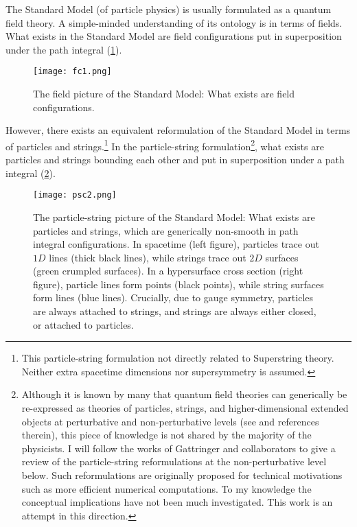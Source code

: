 \documentclass[12pt]{article}
\theoremstyle{definition}
\begin{document}
The Standard Model (of particle physics) is usually formulated as a quantum field theory. A simple-minded understanding of its ontology is in terms of fields. What exists in the Standard Model are field configurations put in superposition under the path integral (\cref{fig:fc1}).

\begin{figure}%
    \centering
    \texttt{[image: fc1.png]}
    \caption{The field picture of the Standard Model: What exists are field configurations.}
    \label{fig:fc1}
\end{figure} 

However, there exists an equivalent reformulation of the Standard Model in terms of particles and strings.\footnote{This  particle-string formulation not directly related to Superstring theory. Neither extra spacetime dimensions nor supersymmetry is assumed.} In the particle-string formulation\footnote{Although it is known by many that quantum field theories can generically be re-expressed as theories of particles, strings, and higher-dimensional extended objects at perturbative and non-perturbative levels (see \cite{Feynman1950MathematicalInteraction, *Feynman1951AnElectrodynamics, Wilson1974ConfinementQuarks, Kleinert1989GaugeMatter, Fernandez1992RandomTheory, Bruegmann19924dMeasure, Ambjrn1997QuantumGeometry, Costello2011RenormalizationTheory, Gattringer2016ApproachesTheory, EdwardsQuantumTheory} and references therein), this piece of knowledge is not shared by the majority of the physicists. I will follow the works of Gattringer and collaborators \cite{Gattringer2013SpectroscopyGas, Mercado2013SurfaceLattice, Gattringer2016ApproachesTheory, Gattringer2018WorldlinesCycles, Marchis2018DualFluxes} to give a review of the particle-string reformulations at the non-perturbative level below. Such reformulations are originally proposed for technical motivations such as more efficient numerical computations. To my knowledge the conceptual implications have not been much investigated. This work is an attempt in this direction.}, what exists are particles and strings bounding each other and put in superposition under a path integral (\cref{fig:psc1}).

\begin{figure}%
    \centering
    \texttt{[image: psc2.png]}
    \caption{The particle-string picture of the Standard Model: What exists are particles and strings, which are generically non-smooth in path integral configurations. In spacetime (left figure), particles trace out $1D$ lines (thick black lines), while strings trace out $2D$ surfaces (green crumpled surfaces). In a hypersurface cross section (right figure), particle lines form points (black points), while string surfaces form lines (blue lines). Crucially, due to gauge symmetry, particles are always attached to strings, and strings are always either closed, or attached to particles.}
    \label{fig:psc1}
\end{figure} 
\end{document}

